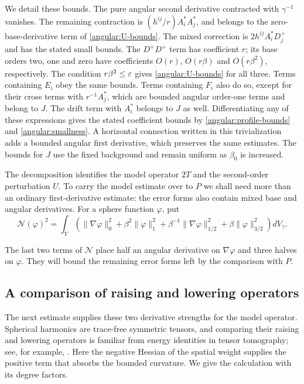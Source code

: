 We detail these bounds.  The pure angular second derivative contracted
with $\gamma^{-1}$ vanishes.  The remaining contraction is
$(h^{ij}/r)A_i^*A_j^*$, and belongs to the zero-base-derivative term of
\eqref{angular:U-bounds}.  The mixed correction is
$2h^{ij}A_i^*D_j^+$ and has the stated small bounds.  The $D^+D^+$ term
has coefficient $r$; its base orders two, one and zero have coefficients
$O(r)$, $O(r\beta)$ and $O(r\beta^2)$, respectively.  The condition
$r\beta^2\le\varepsilon$ gives \eqref{angular:U-bounds} for all three.
Terms containing $E_i$ obey the same bounds.  Terms containing $F_i$
also do so, except for their cross terms with $r^{-1}A_j^*$, which are
bounded angular order-one terms and belong to $J$.  The drift term with
$A_i^*$ belongs to $J$ as well.  Differentiating any of these expressions
gives the stated coefficient bounds by
\eqref{angular:profile-bounds} and \eqref{angular:smallness}.
A horizontal connection written in this trivialization adds a bounded
angular first derivative, which preserves the same estimates.  The bounds
for $J$ use the fixed background and remain uniform as $\beta_0$ is
increased.

The decomposition identifies the model operator $2T$ and the
second-order perturbation $U$.  To carry the model estimate over to $P$
we shall need more than an ordinary first-derivative estimate: the error forms
also contain mixed base and angular derivatives.  For a sphere function
$\varphi$, put
\begin{equation}\label{angular:N-definition}
 \mathcal N(\varphi)^2
 =\int_Y\left(
  \|\nabla\varphi\|_0^2+\beta^2\|\varphi\|_1^2
  +\beta^{-1}\|\nabla\varphi\|_{1/2}^2
  +\beta\|\varphi\|_{3/2}^2\right)dV_\gamma.
\end{equation}

The last two terms of $\mathcal N$ place half an angular derivative
on $\nabla\varphi$ and three halves on $\varphi$.  They will bound the
remaining error forms left by the comparison with $P$.

\subsection{A comparison of raising and lowering operators}

The next estimate supplies these two derivative strengths for the model
operator.  Spherical harmonics are trace-free symmetric tensors, and
comparing their raising and lowering operators is familiar from energy
identities in tensor tomography; see, for example, \cite{PSU15,GPSU16}.
Here the negative Hessian of the spatial weight supplies the positive
term that absorbs the bounded curvature.  We give the calculation with
its degree factors.

